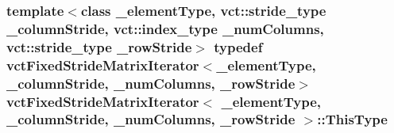 \hypertarget{classvct_fixed_stride_matrix_iterator_a99a6088a50b066ba920c9138d7b3a950}{
\subsubsection[{This\-Type}]{\setlength{\rightskip}{0pt plus 5cm}template$<$class \-\_\-element\-Type, vct\-::stride\-\_\-type \-\_\-column\-Stride, vct\-::index\-\_\-type \-\_\-num\-Columns, vct\-::stride\-\_\-type \-\_\-row\-Stride$>$ typedef {\bf vct\-Fixed\-Stride\-Matrix\-Iterator}$<$\-\_\-element\-Type, \-\_\-column\-Stride, \-\_\-num\-Columns, \-\_\-row\-Stride$>$ {\bf vct\-Fixed\-Stride\-Matrix\-Iterator}$<$ \-\_\-element\-Type, \-\_\-column\-Stride, \-\_\-num\-Columns, \-\_\-row\-Stride $>$\-::{\bf This\-Type}}}\label{classvct_fixed_stride_matrix_iterator_a99a6088a50b066ba920c9138d7b3a950}


